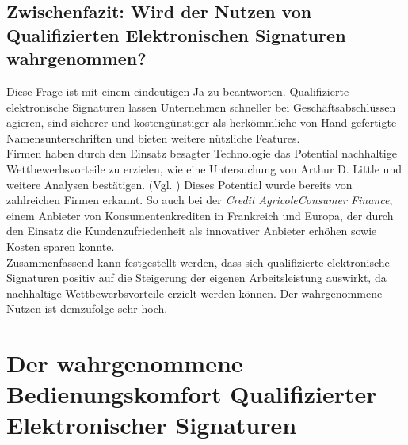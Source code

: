 \documentclass[deutsch]{lib/llncs/llncs}
\begin{document}
\subsection{Zwischenfazit: Wird der Nutzen von Qualifizierten Elektronischen Signaturen wahrgenommen?}
Diese Frage ist mit einem eindeutigen Ja zu beantworten. Qualifizierte elektronische Signaturen lassen Unternehmen schneller bei Geschäftsabschlüssen agieren, sind sicherer und kostengünstiger als herkömmliche von Hand gefertigte Namensunterschriften und bieten weitere nützliche Features. \\
Firmen haben durch den Einsatz besagter Technologie das Potential nachhaltige Wettbewerbsvorteile zu erzielen, wie eine Untersuchung von Arthur D. Little und weitere Analysen bestätigen. (Vgl. \cite[S. 7]{Zitat05})
Dieses Potential wurde bereits von zahlreichen Firmen erkannt. So auch bei der \textit{Credit AgricoleConsumer Finance}, einem Anbieter von Konsumentenkrediten in Frankreich und Europa, der durch den Einsatz die Kundenzufriedenheit als innovativer Anbieter erhöhen sowie Kosten sparen konnte. \cite[S. 13]{Zitat05} \\
Zusammenfassend kann festgestellt werden, dass sich qualifizierte elektronische Signaturen positiv auf die Steigerung der eigenen Arbeitsleistung auswirkt, da nachhaltige Wettbewerbsvorteile erzielt werden können. Der wahrgenommene Nutzen ist demzufolge sehr hoch. 


\section{Der wahrgenommene Bedienungskomfort Qualifizierter Elektronischer Signaturen}
\end{document}
